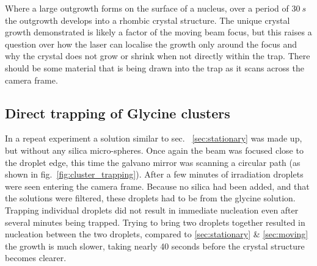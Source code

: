 Where a large outgrowth forms on the surface of a nucleus,
over a period of $30\ s$ the outgrowth develops into a 
rhombic crystal structure. The unique crystal growth 
demonstrated is likely a factor of the moving beam focus,
but this raises a question over how the laser can localise
the growth only around the focus and why the crystal does 
not grow or shrink when not directly within the trap. There
should be some material that is being drawn into the trap
as it scans across the camera frame.

\subsection{Direct trapping of Glycine clusters}
\label{sec:clusters}
In a repeat experiment a solution similar to sec.~
\ref{sec:stationary} was made up, but without any 
silica micro-spheres. Once again the beam was focused 
close to the droplet edge, this time the galvano 
mirror was scanning a circular path (as shown in fig.~\ref{fig:cluster_trapping}). After a few 
minutes of irradiation droplets were seen entering 
the camera frame. Because no silica had been added, 
and that the solutions were filtered, these droplets 
had to be from the glycine solution. Trapping 
individual droplets did not result in immediate 
nucleation even after several minutes being trapped. 
Trying to bring two droplets together resulted in 
nucleation between the two droplets, compared to 
\ref{sec:stationary} \& \ref{sec:moving} the growth 
is much slower, taking nearly 40 seconds before the 
crystal structure becomes clearer.
